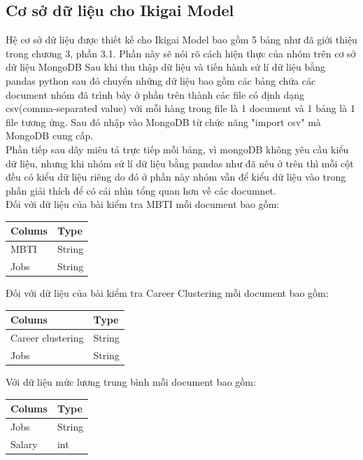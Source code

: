 \subsection{Cơ sở dữ liệu cho Ikigai Model}
\indent Hệ cơ sở dữ liệu được thiết kế cho Ikigai Model bao gồm 5 bảng như đã giới thiệu trong chương 3, phần 3.1. Phần này sẽ nói rõ cách hiện thực của nhóm trên cơ sở dữ liệu MongoDB
\indent Sau khi thu thập dữ liệu và tiến hành sử lí dữ liệu bằng pandas python sau đó chuyển những dữ liệu bao gồm các bảng chứa các document nhóm đã trình bày ở phần trên thành các file có định dạng  csv(comma-separated value) với mỗi hàng trong file là 1 document và 1 bảng là 1 file tương ứng. Sau đó nhập vào MongoDB từ chức năng "import csv" mà MongoDB cung cấp. \\
\indent Phần tiếp sau dây miêu tả trực tiếp mỗi bảng, vì mongoDB không yêu cầu kiểu dữ liệu, nhưng khi nhóm sử lí dữ liệu bằng pandas như đã nêu ở trên thì mỗi cột đều có kiểu dữ liệu riêng do đó ở phần này nhóm vẫn để kiểu dữ liệu vào trong phần giải thích để có cái nhìn tổng quan hơn về các documnet. \\
\newline
\indent Đối với dữ liệu của bài kiểm tra MBTI mỗi document bao gồm:
\begin{table}[H]
    \centering
    \begin{tabular}{@{}ll@{}}
        \toprule
        \textbf{Colums} & \textbf{Type} \\ \midrule
        MBTI & String \\
        Jobs & String \\ \bottomrule
    \end{tabular}
\end{table}

Đối với dữ liệu của bài kiểm tra Career Clustering mỗi document bao gồm:
\begin{table}[H]
    \centering
    \begin{tabular}{@{}ll@{}}
        \toprule
        \textbf{Colums} & \textbf{Type} \\ \midrule
        Career clustering & String \\
        Jobs & String \\ \bottomrule
    \end{tabular}
\end{table}

Với dữ liệu mức lương trung bình mỗi document bao gồm:

\begin{table}[H]
    \centering
    \begin{tabular}{@{}ll@{}}
        \toprule
        \textbf{Colums} & \textbf{Type} \\ \midrule
        Jobs & String \\
        Salary & int \\ \bottomrule
    \end{tabular}
\end{table}

